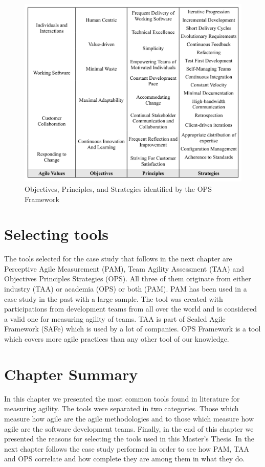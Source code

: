 \begin{figure} [H]
\centerline{\includegraphics[scale=0.75]{include/relatedwork/fig/ops.pdf}}
\caption{Objectives, Principles, and Strategies identified by the \ac{OPS} Framework} 
\label{objectives_principles_strategies}
\end{figure} 

\section{Selecting tools}
The tools selected for the case study that follows in the next chapter are Perceptive Agile Measurement (PAM), Team Agility Assessment (TAA) and Objectives Principles Strategies (OPS). All three of them originate from either industry (\ac{TAA}) or academia (\ac{OPS}) or both (\ac{PAM}). \ac{PAM} has been used in a case study in the past with a large sample. The tool was created with participations from development teams from all over the world and is considered a valid one for measuring agility of teams. \ac{TAA} is part of Scaled Agile Framework (SAFe) \cite{scaled_agile_framework} which is used by a lot of companies. \ac{OPS} Framework is a tool which covers more agile practices than any other tool of our knowledge.

\section{Chapter Summary}
In this chapter we presented the most common tools found in literature for measuring agility. The tools were separated in two categories. Those which measure how agile are the agile methodologies and to those which measure how agile are the software development teams. Finally, in the end of this chapter we presented the reasons for selecting the tools used in this Master's Thesis. 
In the next chapter follows the case study performed in order to see how \ac{PAM}, \ac{TAA} and \ac{OPS} correlate and how complete they are among them in what they do.
